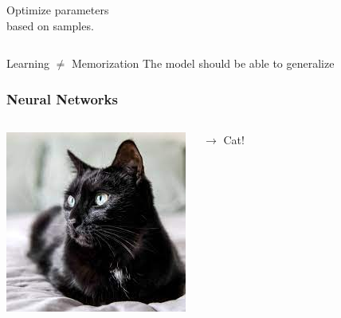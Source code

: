 \documentclass{beamer}
\begin{document}
\begin{frame}[fragile]
\begin{columns}[t]
\begin{center}
        Optimize parameters\\
        based on samples.
      \end{center}
  \end{columns}
  \pause
  \vfill

  \begin{alertblock}{Learning \(\neq\) Memorization}
    The model should be able to generalize
  \end{alertblock}
\end{frame}

\begin{frame}
  \frametitle{Neural Networks}
  \begin{columns}
      \hspace{-15pt}
      \includegraphics[width=1.5\textwidth]{figures/animales/cat2.jpg}
      
      \hfill
      \begin{tikzpicture}[x=.87cm, y=1.cm, >=latex]
        
      \end{tikzpicture}
      $\longrightarrow$ Cat!
  \end{columns}
  \begin{columns}
    \vspace{-30pt}


\end{columns}
\end{frame}
\end{document}
